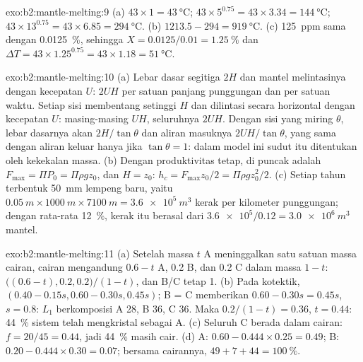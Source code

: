 \begin{solution}{exo:b2:mantle-melting:9}
(a) $43\times1 = \qty{43}{\celsius}$; $43\times5^{0.75} = 43\times3.34 =
\qty{144}{\celsius}$; $43\times13^{0.75} = 43\times6.85 = \qty{294}{\celsius}$.
(b) $1213.5 - 294 = \qty{919}{\celsius}$. (c) \qty{125}{ppm} sama dengan
\qty{0.0125}{\percent}, sehingga $X = 0.0125/0.01 = \qty{1.25}{\percent}$ dan $\Delta T =
43\times1.25^{0.75} = 43\times1.18 = \qty{51}{\celsius}$.
\end{solution}

\begin{solution}{exo:b2:mantle-melting:10}
(a) Lebar dasar segitiga $2H$ dan mantel melintasinya dengan kecepatan $U$: $2UH$ per satuan panjang
punggungan dan per satuan waktu. Setiap sisi membentang setinggi $H$ dan dilintasi secara horizontal dengan kecepatan
$U$: masing-masing $UH$, seluruhnya $2UH$. Dengan sisi yang miring $\theta$, lebar dasarnya akan
$2H/\tan\theta$ dan aliran masuknya $2UH/\tan\theta$, yang sama dengan aliran keluar hanya jika
$\tan\theta = 1$: dalam model ini sudut itu ditentukan oleh kekekalan massa. (b) Dengan
produktivitas tetap,  di puncak adalah $F_{\max} = \Pi P_0 = \Pi\rho
g z_0$, dan $H = z_0$: $h_c = F_{\max}z_0/2 = \Pi\rho g z_0^2/2$. (c) Setiap tahun
terbentuk \qty{50}{mm} lempeng baru, yaitu $\qty{0.05}{m}\times\qty{1000}{m}\times\qty{7100}{m} =
\qty{3.6e5}{m^3}$ kerak per kilometer punggungan; dengan  rata-rata \qty{12}{\percent},
kerak itu berasal dari $\num{3.6e5}/0.12 = \qty{3.0e6}{m^3}$ mantel.
\end{solution}

\begin{solution}{exo:b2:mantle-melting:11}
(a) Setelah massa $t$ A meninggalkan satu satuan massa cairan, cairan mengandung $0.6 -
t$ A, 0.2 B, dan 0.2 C dalam massa $1 - t$: $\big((0.6 - t), 0.2,
0.2\big)/(1 - t)$, dan B/C tetap 1. (b) Pada kotektik, $(0.40 - 0.15s, 0.60 -
0.30s, 0.45s)$; B = C memberikan $0.60 - 0.30s = 0.45s$, $s = 0.8$: $L_1$ berkomposisi A 28, B
36, C 36. Maka $0.2/(1 - t) = 0.36$, $t = 0.44$: \qty{44}{\percent} sistem telah
mengkristal sebagai A. (c) Seluruh C berada dalam cairan: $f = 20/45 = 0.44$, jadi
\qty{44}{\percent} masih cair. (d) A: $0.60 - 0.444\times0.25 = 0.49$; B: $0.20 -
0.444\times0.30 = 0.07$; bersama cairannya, $49 + 7 + 44 = \qty{100}{\percent}$.
\end{solution}

